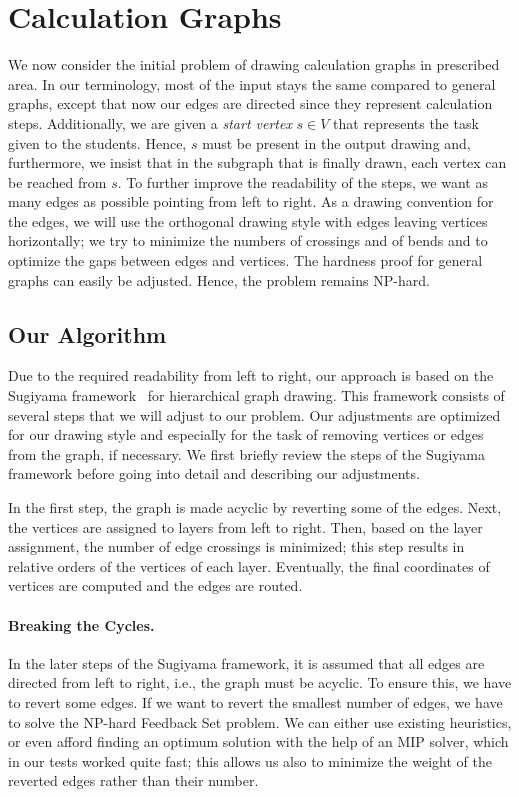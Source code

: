 \documentclass[]{llncs}
\begin{document}
\section{Calculation Graphs}
\label{sec:calculation}

We now consider the initial problem of drawing calculation graphs in
prescribed area.
In our terminology, most of the input stays the same compared to
general graphs, except that now our edges are directed since they
represent calculation steps. Additionally, we are given a
\emph{start vertex} $s \in V$ that represents the task given to the
students. Hence, $s$ must be present in the output drawing and,
furthermore, we insist that in the subgraph that is finally drawn,
each vertex can be reached from $s$. To further improve the
readability of the steps, we want as many edges as possible pointing
from left to right. As a drawing convention for the edges, we will use
the orthogonal drawing style with edges leaving vertices horizontally;
we try to minimize the numbers of crossings and of bends and to
optimize the gaps between edges and vertices.
The hardness proof for general graphs can easily be adjusted. Hence,
the problem remains NP-hard.


\subsection{Our Algorithm}
Due to the required readability from left to right, our approach is
based on the Sugiyama framework~\cite{sugiyama1981methods} for
hierarchical graph drawing. This framework consists of several steps
that we will adjust to our problem.  Our adjustments are optimized for
our drawing style and especially for the task of removing vertices or
edges from the graph, if necessary. We first briefly review the steps
of the Sugiyama framework before going into detail and describing our
adjustments.

In the first step, the graph is made acyclic by reverting some of the
edges. Next, the vertices are assigned to layers from left to right.
Then, based on the layer assignment, the number of edge crossings is
minimized; this step results in relative
orders of the vertices of each layer. Eventually, the final
coordinates of vertices are computed and the edges are routed.

\paragraph{Breaking the Cycles.}
In the later steps of the Sugiyama framework, it is assumed
that all edges are directed from left to right, i.e., the graph must
be acyclic. To ensure this, we
have to revert some edges. If we want to  revert the smallest number
of edges, we have to solve the NP-hard Feedback Set problem. We can either
use existing heuristics, or even afford finding an
optimum solution with the help of an MIP solver, which in our tests
worked quite fast; this allows us also to minimize the weight of the
reverted edges rather than their number.
\end{document}
